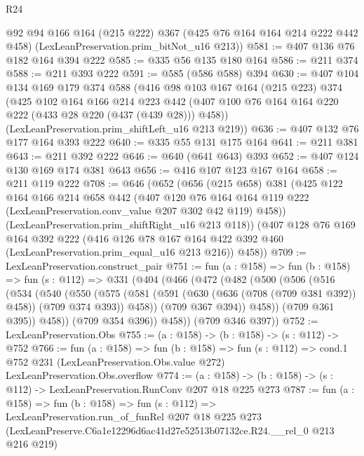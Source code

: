 \begin{lexlean}{R24}
\begin{coremodule}
      @92
      @94
      @166
      @164
      (@215 @222)
      @367
      (@425 @76 @164 @164 @214 @222 @442 @458)
      (LexLeanPreservation.prim_bitNot_u16 @213))
@581 := @407 @136 @76 @182 @164 @394 @222
@585 := @335 @56 @135 @180 @164
@586 := @211 @374
@588 := @211 @393 @222
@591 := @585 (@586 @588) @394
@630 := @407
    @104
    @134
    @169
    @179
    @374
    @588
    (@416
      @98
      @103
      @167
      @164
      (@215 @223)
      @374
      (@425
        @102
        @164
        @166
        @214
        @223
        @442
        (@407 @100 @76 @164 @164 @220 @222 (@433 @28 @220 (@437 (@439 @28))) @458))
      (LexLeanPreservation.prim_shiftLeft_u16 @213 @219))
@636 := @407 @132 @76 @177 @164 @393 @222
@640 := @335 @55 @131 @175 @164
@641 := @211 @381
@643 := @211 @392 @222
@646 := @640 (@641 @643) @393
@652 := @407 @124 @130 @169 @174 @381 @643
@656 := @416 @107 @123 @167 @164
@658 := @211 @119 @222
@708 := @646
    (@652
      (@656
        (@215 @658)
        @381
        (@425
          @122
          @164
          @166
          @214
          @658
          @442
          (@407
            @120
            @76
            @164
            @164
            @119
            @222
            (LexLeanPreservation.conv_value @207 @302 @42 @119)
            @458))
        (LexLeanPreservation.prim_shiftRight_u16 @213 @118))
      (@407
        @128
        @76
        @169
        @164
        @392
        @222
        (@416 @126 @78 @167 @164 @422 @392 @460 (LexLeanPreservation.prim_equal_u16 @213 @216))
        @458))
@709 := LexLeanPreservation.construct_pair
@751 := fun (a : @158) =>
  fun (b : @158) =>
  fun (s : @112) =>
  @331
    (@404
      (@466
        (@472
          (@482
            (@500
              (@506
                (@516
                  (@534
                    (@540
                      (@550
                        (@575
                          (@581
                            (@591 (@630 (@636 (@708 (@709 @381 @392)) @458)) (@709 @374 @393))
                            @458))
                        (@709 @367 @394))
                      @458))
                  (@709 @361 @395))
                @458))
            (@709 @354 @396))
          @458))
      (@709 @346 @397))
@752 := LexLeanPreservation.Obs
@755 := (a : @158) -> (b : @158) -> (s : @112) -> @752
@766 := fun (a : @158) =>
  fun (b : @158) =>
  fun (s : @112) =>
  cond.{1} @752 @231 (LexLeanPreservation.Obs.value @272) LexLeanPreservation.Obs.overflow
@774 := (a : @158) -> (b : @158) -> (s : @112) -> LexLeanPreservation.RunConv @207 @18 @225 @273
@787 := fun (a : @158) =>
  fun (b : @158) =>
  fun (s : @112) =>
  LexLeanPreservation.run_of_funRel
    @207
    @18
    @225
    @273
    (LexLeanPreserve.C6a1e12296d6ac41d27e52513b07132ce.R24.__rel_0 @213 @216 @219)
\end{coremodule}
\end{lexlean}
